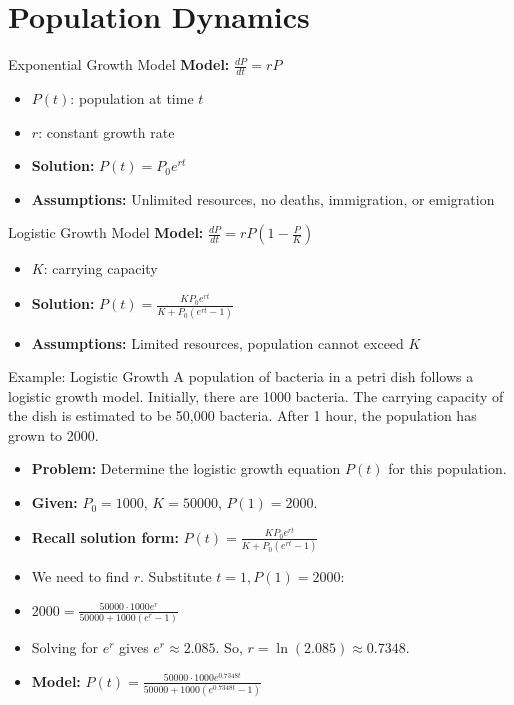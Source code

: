 \documentclass[10pt,aspectratio=169]{beamer}
\begin{document}
\section{Population Dynamics}
\begin{frame}{Exponential Growth Model}
    \textbf{Model:} $\frac{dP}{dt} = rP$
    \begin{itemize}
        \item $P(t)$: population at time $t$
        \item $r$: constant growth rate
        \item \textbf{Solution:} $P(t) = P_0 e^{rt}$
        \item \textbf{Assumptions:} Unlimited resources, no deaths, immigration, or emigration
    \end{itemize}
\end{frame}

\begin{frame}{Logistic Growth Model}
    \textbf{Model:} $\frac{dP}{dt} = rP\left(1-\frac{P}{K}\right)$
    \begin{itemize}
        \item $K$: carrying capacity
        \item \textbf{Solution:} $P(t) = \frac{KP_0 e^{rt}}{K + P_0 (e^{rt} - 1)}$
        \item \textbf{Assumptions:} Limited resources, population cannot exceed $K$
    \end{itemize}
\end{frame}

\begin{frame}{Example: Logistic Growth}
    A population of bacteria in a petri dish follows a logistic growth model. Initially, there are 1000 bacteria. The carrying capacity of the dish is estimated to be 50,000 bacteria. After 1 hour, the population has grown to 2000.
    \begin{itemize}
        \item \textbf{Problem:} Determine the logistic growth equation $P(t)$ for this population.
        \item \textbf{Given:} $P_0 = 1000$, $K = 50000$, $P(1) = 2000$.
        \item \textbf{Recall solution form:} $P(t) = \frac{KP_0 e^{rt}}{K + P_0 (e^{rt} - 1)}$
        \item We need to find $r$. Substitute $t=1, P(1)=2000$:
        \item $2000 = \frac{50000 \cdot 1000 e^{r}}{50000 + 1000 (e^{r} - 1)}$
        \item Solving for $e^r$ gives $e^r \approx 2.085$. So, $r = \ln(2.085) \approx 0.7348$.
        \item \textbf{Model:} $P(t) = \frac{50000 \cdot 1000 e^{0.7348t}}{50000 + 1000 (e^{0.7348t} - 1)}$
    \end{itemize}
\end{frame}
\end{document}
